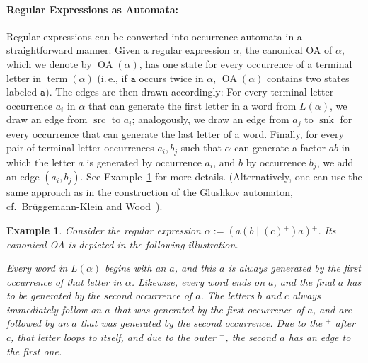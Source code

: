\documentclass[a4paper,11pt, svgnames,titlepage]{article}
\newcommand{\rxp}{{^\mathtt{+}}}
\DeclareMathOperator{\ror}{\mathtt{|}}
\newcommand{\df}{:=}
\DeclareMathOperator{\src}{src}
\DeclareMathOperator{\snk}{snk}
\DeclareMathOperator{\OA}{OA}
\DeclareMathOperator{\term}{term}
\newtheorem{example}{Example}
\begin{document}
\paragraph{Regular Expressions as Automata:} Regular expressions can be converted into occurrence automata in a straightforward manner: Given a regular expression $\alpha$, the canonical OA of $\alpha$, which we denote by $\OA(\alpha)$, has one state for every occurrence of a terminal letter in $\term(\alpha)$ (i.\,e., if $\mathtt{a}$ occurs twice in $\alpha$, $\OA(\alpha)$ contains two states labeled $\mathtt{a}$). The edges are then drawn accordingly: For every terminal letter occurrence $a_i$ in $\alpha$ that can generate the first letter in a word from $L(\alpha)$, we draw an edge from $\src$ to $a_i$; analogously, we draw an edge from $a_j$ to $\snk$ for every occurrence that can generate the last letter of a word. Finally, for every pair of terminal letter occurrences $a_i,b_j$ such that $\alpha$ can generate a factor $ab$ in which the letter $a$ is generated by occurrence $a_i$, and $b$ by occurrence $b_j$, we add an edge $(a_i,b_j)$. See Example~\ref{ex:oa} for more details. (Alternatively, one can use the same approach as in the construction of the Glushkov automaton, cf.\ Brüggemann-Klein and Wood~\cite{bru:one}).

\begin{example}\label{ex:oa}
Consider the regular expression $\alpha\df (a(b\ror (c)\rxp)a)\rxp$. Its canonical OA is depicted in the following illustration.
\begin{center}
	
\end{center}
Every word in $L(\alpha)$ begins with an $a$, and this $a$ is always generated by the first occurrence of that letter in $\alpha$. Likewise, every word ends on $a$, and the final $a$ has to be generated by the second occurrence of $a$. The letters $b$ and $c$ always immediately follow an $a$ that was generated by the first occurrence of $a$, and are followed by an $a$ that was generated by the second occurrence. Due to the $\rxp$ after $c$, that letter loops to itself, and due to the outer $\rxp$, the second $a$ has an edge to the first one.
\end{example}
\end{document}
